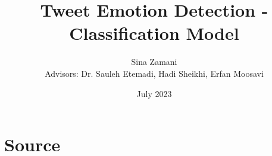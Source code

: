 \documentclass[rnd]{extarticle}
\begin{document}
  

	\title{Tweet Emotion Detection - Classification Model}

	\author{Sina Zamani\\[0.2cm]{\small Advisors: Dr. Sauleh Etemadi, Hadi Sheikhi, Erfan Moosavi}}

	\date{July 2023}
	
	\maketitle

	\pagestyle{plain}
	
	
	\section{Source}
		
	
	
	
\end{document}
